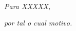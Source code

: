 \thispagestyle{empty}

\ \\

\newpage

\thispagestyle{empty}

\begin{center}
\begin{minipage}[l][10cm][t]{14cm}


	\vspace{5.5cm}

	\begin{flushright}

	{\em Para XXXXX,\quad}

	{\em por tal o cual motivo.\quad}

	\end{flushright}

\end{minipage}
\end{center}

\newpage

\thispagestyle{empty}

\ \\

